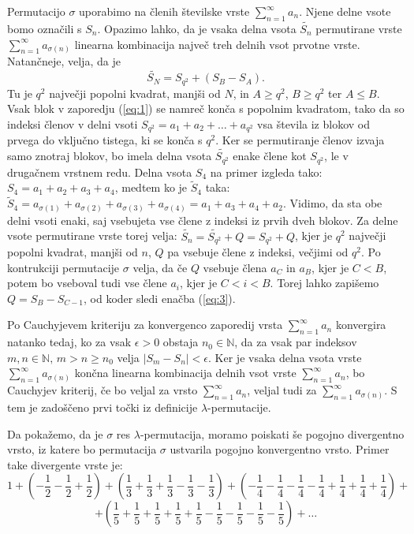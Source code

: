 \documentclass[12pt,a4paper,reqno]{amsart}
\theoremstyle{definition} %
\theoremstyle{plain} %
\newcommand{\N}{\mathbb N}
\begin{document}
Permutacijo $\sigma$ uporabimo na členih številske vrste $\sum^{\infty}_{n=1}a_n$. Njene delne vsote bomo označili s $S_n$. Opazimo lahko, da je vsaka delna vsota $\tilde{S_n}$ permutirane vrste $\sum^{\infty}_{n=1}a_{\sigma(n)}$ linearna kombinacija največ treh delnih vsot prvotne vrste. Natančneje, velja, da je 
\begin{equation}
\tilde{S_N}=S_{q^2}+(S_B-S_A).\label{eq:3} 
\end{equation}
Tu je $q^2$ največji popolni kvadrat, manjši od $N$, in $A \geq q^2$, $B \geq q^2$ ter $A \leq B$. Vsak blok v zaporedju (\ref{eq:1}) se namreč konča s popolnim kvadratom, tako da so indeksi členov v delni vsoti $S_{q^2}=a_1+a_2+\ldots+a_{q^2}$ vsa števila iz blokov od prvega do vključno tistega, ki se konča s $q^2$. Ker se permutiranje členov izvaja samo znotraj blokov, bo imela delna vsota $\tilde{S_{q^2}}$ enake člene kot $S_{q^2}$, le v drugačnem vrstnem redu. Delna vsota $S_4$ na primer izgleda tako: $S_4 = a_1+a_2+a_3+a_4$, medtem ko je $\tilde{S}_4$ taka: $\tilde{S}_4=a_{\sigma(1)}+a_{\sigma(2)}+a_{\sigma(3)}+a_{\sigma(4)}=a_1+a_3+a_4+a_2$. Vidimo, da sta obe delni vsoti enaki, saj vsebujeta vse člene z indeksi iz prvih dveh blokov. Za delne vsote  permutirane vrste torej velja: $\tilde{S_n}=\tilde{S_{q^2}}+Q=S_{q^2}+Q$, kjer je $q^2$ največji popolni kvadrat, manjši od $n$, $Q$ pa vsebuje člene z indeksi, večjimi od $q^2$. Po kontrukciji permutacije $\sigma$ velja, da če $Q$ vsebuje člena $a_C$ in $a_B$, kjer je $C < B$, potem bo vseboval tudi vse člene $a_i$, kjer je $C<i<B$. Torej lahko zapišemo $Q=S_B-S_{C-1}$, od koder sledi enačba (\ref{eq:3}).

Po Cauchyjevem kriteriju za konvergenco zaporedij vrsta $\sum^{\infty}_{n=1}a_n$ konvergira natanko tedaj, ko za vsak $\epsilon >0$ obstaja $n_0 \in \N$, da za vsak par indeksov $m,n\in \N \textrm{, }m>n\geq n_0$ velja $|S_m-S_n|<\epsilon$. Ker je vsaka delna vsota vrste $\sum^{\infty}_{n=1}a_{\sigma(n)}$ končna linearna kombinacija delnih vsot vrste $\sum^{\infty}_{n=1}a_{n}$, bo Cauchyjev kriterij, če bo veljal za vrsto $\sum^{\infty}_{n=1}a_{n}$, veljal tudi za $\sum^{\infty}_{n=1}a_{\sigma(n)}$. S tem je zadoščeno prvi točki iz definicije $\lambda$-permutacije. %

Da pokažemo, da je $\sigma$ res $\lambda$-permutacija, moramo poiskati še pogojno divergentno vrsto, iz katere bo permutacija $\sigma$ ustvarila pogojno konvergentno vrsto. Primer take divergente vrste je:
$$1+\left (-\frac{1}{2}-\frac{1}{2}+\frac{1}{2}\right )+\left (\frac{1}{3}+\frac{1}{3}+\frac{1}{3}-\frac{1}{3}-\frac{1}{3} \right )+\left (-\frac{1}{4}-\frac{1}{4}-\frac{1}{4}-\frac{1}{4}+\frac{1}{4}+\frac{1}{4}+\frac{1}{4}\right )+$$ $$+\left (\frac{1}{5}+\frac{1}{5}+\frac{1}{5}+\frac{1}{5}+\frac{1}{5}-\frac{1}{5}-\frac{1}{5}-\frac{1}{5}-\frac{1}{5} \right )+\dots $$
\end{document}
